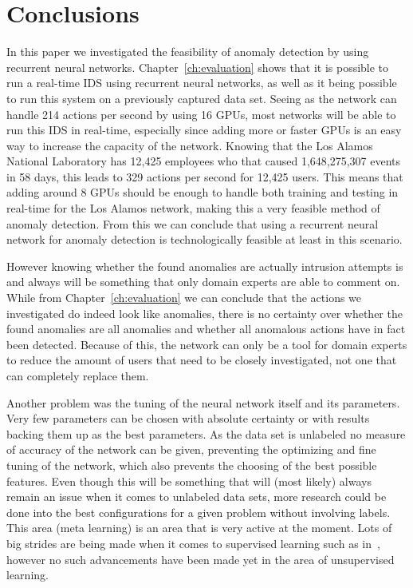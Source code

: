 \chapter{Conclusions}\label{ch:conclusions}

In this paper we investigated the feasibility of anomaly detection by using recurrent neural networks. Chapter~\ref{ch:evaluation} shows that it is possible to run a real-time IDS using recurrent neural networks, as well as it being possible to run this system on a previously captured data set. Seeing as the network can handle 214 actions per second by using 16 GPUs, most networks will be able to run this IDS in real-time, especially since adding more or faster GPUs is an easy way to increase the capacity of the network. Knowing that the Los Alamos National Laboratory has 12,425 employees who that caused 1,648,275,307 events in 58 days, this leads to 329 actions per second for 12,425 users. This means that adding around 8 GPUs should be enough to handle both training and testing in real-time for the Los Alamos network, making this a very feasible method of anomaly detection. From this we can conclude that using a recurrent neural network for anomaly detection is technologically feasible at least in this scenario. 

However knowing whether the found anomalies are actually intrusion attempts is and always will be something that only domain experts are able to comment on. While from Chapter~\ref{ch:evaluation} we can conclude that the actions we investigated do indeed look like anomalies, there is no certainty over whether the found anomalies are all anomalies and whether all anomalous actions have in fact been detected. Because of this, the network can only be a tool for domain experts to reduce the amount of users that need to be closely investigated, not one that can completely replace them. 

Another problem was the tuning of the neural network itself and its parameters. Very few parameters can be chosen with absolute certainty or with results backing them up as the best parameters. As the data set is unlabeled no measure of accuracy of the network can be given, preventing the optimizing and fine tuning of the network, which also prevents the choosing of the best possible features. Even though this will be something that will (most likely) always remain an issue when it comes to unlabeled data sets, more research could be done into the best configurations for a given problem without involving labels. This area (meta learning) is an area that is very active at the moment. Lots of big strides are being made when it comes to supervised learning such as in~\cite{zoph2016neural}, however no such advancements have been made yet in the area of unsupervised learning.
